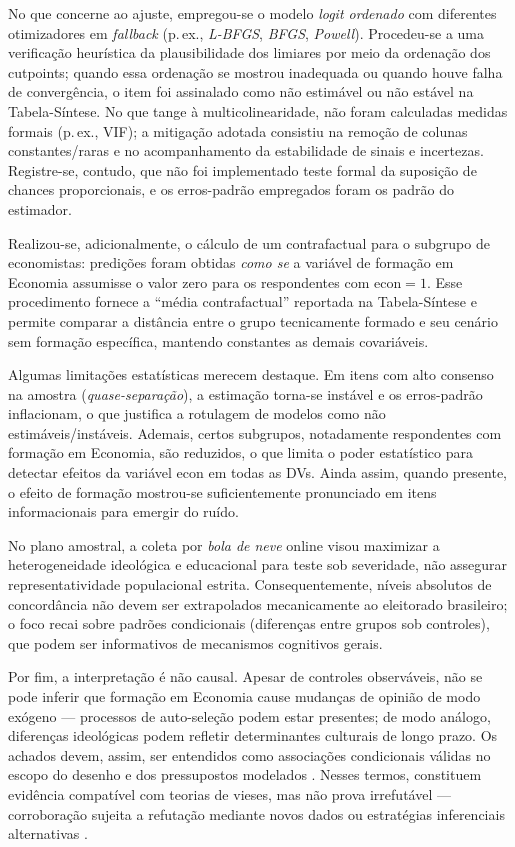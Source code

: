 No que concerne ao ajuste, empregou-se o modelo \textit{logit ordenado} com diferentes otimizadores em \textit{fallback} (p.\,ex., \textit{L-BFGS}, \textit{BFGS}, \textit{Powell}). Procedeu-se a uma verificação heurística da plausibilidade dos limiares por meio da ordenação dos cutpoints; quando essa ordenação se mostrou inadequada ou quando houve falha de convergência, o item foi assinalado como não estimável ou não estável na Tabela-Síntese. No que tange à multicolinearidade, não foram calculadas medidas formais (p.\,ex., VIF); a mitigação adotada consistiu na remoção de colunas constantes/raras e no acompanhamento da estabilidade de sinais e incertezas. Registre-se, contudo, que não foi implementado teste formal da suposição de chances proporcionais, e os erros-padrão empregados foram os padrão do estimador.

Realizou-se, adicionalmente, o cálculo de um contrafactual para o subgrupo de economistas: predições foram obtidas \textit{como se} a variável de formação em Economia assumisse o valor zero para os respondentes com \(\mathrm{econ}=1\). Esse procedimento fornece a ``média contrafactual'' reportada na Tabela-Síntese e permite comparar a distância entre o grupo tecnicamente formado e seu cenário sem formação específica, mantendo constantes as demais covariáveis.

Algumas limitações estatísticas merecem destaque. Em itens com alto consenso na amostra (\textit{quase-separação}), a estimação torna-se instável e os erros-padrão inflacionam, o que justifica a rotulagem de modelos como não estimáveis/instáveis. Ademais, certos subgrupos, notadamente respondentes com formação em Economia, são reduzidos, o que limita o poder estatístico para detectar efeitos da variável \(\mathrm{econ}\) em todas as DVs. Ainda assim, quando presente, o efeito de formação mostrou-se suficientemente pronunciado em itens informacionais para emergir do ruído.

No plano amostral, a coleta por \textit{bola de neve} online visou maximizar a heterogeneidade ideológica e educacional para teste sob severidade, não assegurar representatividade populacional estrita. Consequentemente, níveis absolutos de concordância não devem ser extrapolados mecanicamente ao eleitorado brasileiro; o foco recai sobre padrões condicionais (diferenças entre grupos sob controles), que podem ser informativos de mecanismos cognitivos gerais. 

Por fim, a interpretação é não causal. Apesar de controles observáveis, não se pode inferir que formação em Economia cause mudanças de opinião de modo exógeno — processos de auto-seleção podem estar presentes; de modo análogo, diferenças ideológicas podem refletir determinantes culturais de longo prazo. Os achados devem, assim, ser entendidos como associações condicionais válidas no escopo do desenho e dos pressupostos modelados \cite{hausman2008}. Nesses termos, constituem evidência compatível com teorias de vieses, mas não prova irrefutável — corroboração sujeita a refutação mediante novos dados ou estratégias inferenciais alternativas \cite{popperlogic}.

